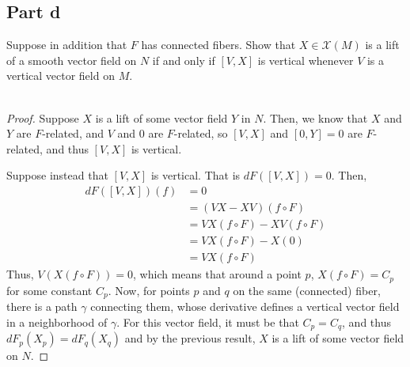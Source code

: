 \documentclass[fontsize=11pt]{scrartcl} %
\numberwithin{equation}{section} %
\numberwithin{figure}{section} %
\numberwithin{table}{section} %
\begin{document}
\subsection*{Part d}
Suppose in addition that $F$ has connected fibers. Show that
$X\in\mathcal{X}(M)$ is a lift of a smooth vector field on $N$ if and only if
$[V,X]$ is vertical whenever $V$ is a vertical vector field on $M$.
\\
\\
\begin{proof}
Suppose $X$ is a lift of some vector field $Y$ in $N$. Then,
we know that $X$ and $Y$ are $F$-related, and $V$ and $0$ are $F$-related, so
    $[V,X]$ and $[0,Y]=0$ are $F$-related, and thus $[V,X]$ is vertical.

    Suppose instead that $[V,X]$ is vertical. That is $dF([V,X])=0$.
    Then,
    \[
        \begin{aligned}
            dF([V,X])(f) &= 0\\
                        &= (VX-XV)(f\circ F)\\
                        &=VX(f\circ F) - XV(f\circ F)\\
                        &=VX(f\circ F) - X(0)\\
                        &=VX(f\circ F)
        \end{aligned}
    \]
    Thus, $V(X(f\circ F)) = 0$, which means that around a point $p$, $X(f\circ
    F) = C_p$ for some constant $C_p$. Now, for points $p$ and $q$ on the same
    (connected) fiber, there is a path $\gamma$ connecting them, whose
    derivative defines a vertical vector field in a neighborhood of $\gamma$.
    For this vector field, it must be that $C_p=C_q$, and thus $dF_p(X_p)
    =dF_q(X_q)$ and by the previous result, $X$ is a lift of some vector field
    on $N$.
\end{proof}
\end{document}
